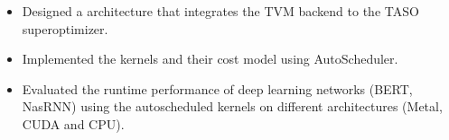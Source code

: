 \documentclass{resume}
\begin{document}
\begin{itemize}
  \item Designed a architecture that integrates the TVM backend to the TASO superoptimizer. 
  \item Implemented the kernels and their cost model using AutoScheduler. 
  \item Evaluated the runtime performance of deep learning networks (BERT, NasRNN) using the autoscheduled kernels on different architectures (Metal, CUDA and CPU). 
\end{itemize}


\end{document}
